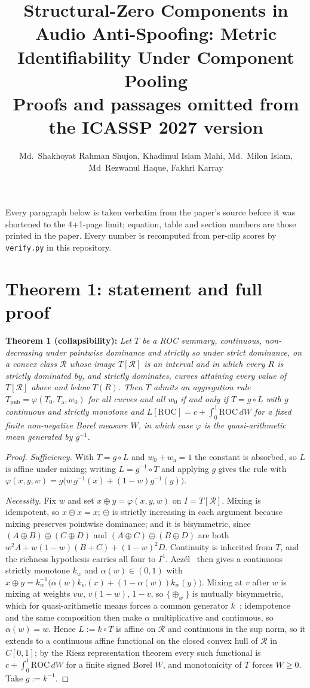 \documentclass[10pt]{article}
\title{Structural-Zero Components in Audio Anti-Spoofing: Metric Identifiability Under Component Pooling\\[4pt]\large Proofs and passages omitted from the ICASSP 2027 version}
\author{Md.~Shakhoyat Rahman Shujon, Khadimul Islam Mahi, Md.~Milon Islam, Md~Rezwanul Haque, Fakhri Karray}
\date{}
\begin{document}
\maketitle
\noindent Every paragraph below is taken verbatim from the paper's source before it was shortened to the
4+1-page limit; equation, table and section numbers are those printed in the paper. Every number is
recomputed from per-clip scores by \texttt{verify.py} in this repository.

\section{Theorem 1: statement and full proof}

\vspace{2pt}\noindent\textbf{Theorem 1 (collapsibility): } \emph{Let $T$ be a ROC summary,
continuous, non-decreasing under pointwise dominance and strictly so under strict dominance, on a convex class $\mathcal{R}$
whose image $T[\mathcal{R}]$ is an interval and in which every $R$ is strictly dominated by, and strictly dominates, curves attaining every value of $T[\mathcal{R}]$ above and below $T(R)$. Then $T$ admits an aggregation rule $T_{\mathrm{pub}} = \varphi(T_0,
T_{\mathrm{a}}, w_0)$ for all curves and all $w_0$ if and only if $T = g \circ L$ with $g$
continuous and strictly monotone and $L[\mathrm{ROC}] = c + \int_0^1 \mathrm{ROC}\,dW$ for a fixed
finite non-negative Borel measure $W$, in which case $\varphi$ is the quasi-arithmetic mean generated by $g^{-1}$.}

\begin{proof}
\emph{Sufficiency.} With $T=g\circ L$ and $w_0+w_{\mathrm{a}}=1$ the constant is absorbed, so $L$ is
affine under mixing; writing $L=g^{-1}\!\circ T$ and applying $g$ gives the rule with
$\varphi(x,y,w)=g\big(w\,g^{-1}(x)+(1-w)g^{-1}(y)\big)$.

\emph{Necessity.} Fix $w$ and set $x\oplus y=\varphi(x,y,w)$ on $I=T[\mathcal{R}]$. Mixing is
idempotent, so $x\oplus x=x$; $\oplus$ is strictly increasing in each argument because mixing
preserves pointwise dominance; and it is bisymmetric, since $(A\oplus B)\oplus(C\oplus D)$ and
$(A\oplus C)\oplus(B\oplus D)$ are both $w^2A+w(1-w)(B+C)+(1-w)^2D$. Continuity is inherited from
$T$, and the richness hypothesis carries all four to $I^4$. Acz\'el~\cite[\S6.4]{aczel1966} then gives a
continuous strictly monotone $k_w$ and $\alpha(w)\in(0,1)$ with $x\oplus y=k_w^{-1}\big(\alpha(w)
k_w(x)+(1-\alpha(w))k_w(y)\big)$. Mixing at $v$ after $w$ is mixing at weights $vw,\,v(1-w),\,1-v$,
so $\{\oplus_w\}$ is mutually bisymmetric, which for quasi-arithmetic means forces a common generator $k$~\cite[Chs.~17--18]{aczel1989}; idempotence and the same composition then make $\alpha$ multiplicative and
continuous, so $\alpha(w)=w$. Hence $L:=k\circ T$ is affine on $\mathcal{R}$ and continuous in the
sup norm, so it extends to a continuous affine functional on the closed convex hull of $\mathcal{R}$
in $C[0,1]$; by the Riesz representation theorem every such functional is $c+\int_0^1\mathrm{ROC}\,dW$
for a finite signed Borel $W$, and monotonicity of $T$ forces $W\ge 0$. Take $g:=k^{-1}$.
\end{proof}
\end{document}
